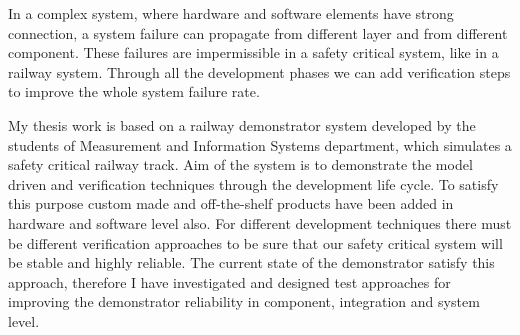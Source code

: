 In a complex system, where hardware and software elements have strong connection, a system failure can propagate from different layer and from different component. These failures are impermissible in a safety critical system, like in a railway system. Through all the development phases we can add verification steps to improve the whole system failure rate.

My thesis work is based on a railway demonstrator system developed by the students of Measurement and Information Systems department, which simulates a safety critical railway track. Aim of the system is to demonstrate the model driven and verification techniques through the development life cycle. To satisfy this purpose custom made and off-the-shelf products have been added in hardware and software level also. For different development techniques there must be different verification approaches to be sure that our safety critical system will be stable and highly reliable. The current state of the demonstrator satisfy this approach, therefore I have investigated and designed test approaches for improving the demonstrator reliability in component, integration and system level.


\vfill
\selectthesislanguage

\setcounter{romanPage}{\value{page}}

